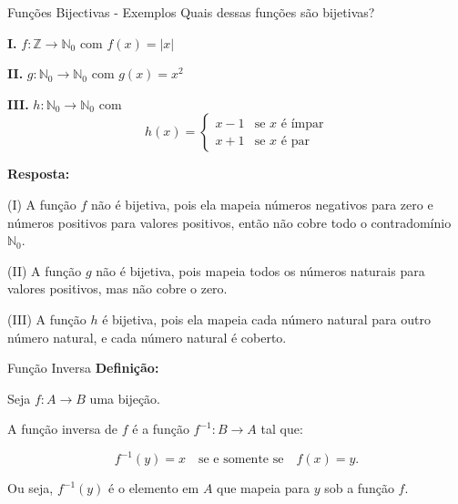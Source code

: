   \begin{frame}{Funções Bijectivas - Exemplos}
    Quais dessas funções são bijetivas?
    
    \textbf{I.} \(f : \mathbb{Z} \to \mathbb{N}_0\) com \(f (x) = |x|\)
  
    \textbf{II.} \(g : \mathbb{N}_0 \to \mathbb{N}_0\) com \(g(x) = x^2\)
  
    \textbf{III.} \(h : \mathbb{N}_0 \to \mathbb{N}_0\) com
    \[
      h(x) =
      \begin{cases}
        x - 1 & \text{se } x \text{ é ímpar} \\
        x + 1 & \text{se } x \text{ é par}
      \end{cases}
    \]
    
    \textbf{Resposta:}
    
    (I) A função \(f\) não é bijetiva, pois ela mapeia números negativos para zero e números positivos para valores positivos, então não cobre todo o contradomínio \(\mathbb{N}_0\).
  
    (II) A função \(g\) não é bijetiva, pois mapeia todos os números naturais para valores positivos, mas não cobre o zero.
  
    (III) A função \(h\) é bijetiva, pois ela mapeia cada número natural para outro número natural, e cada número natural é coberto.
  
  \end{frame}

  \begin{frame}{Função Inversa}
    \textbf{Definição:}
    
    Seja \(f : A \to B\) uma bijeção.
    
    A função inversa de \(f\) é a função \(f^{-1} : B \to A\) tal que:
    
    \[f^{-1}(y) = x \quad \text{se e somente se} \quad f(x) = y.\]
    
    Ou seja, \(f^{-1}(y)\) é o elemento em \(A\) que mapeia para \(y\) sob a função \(f\).
  \end{frame}
  
